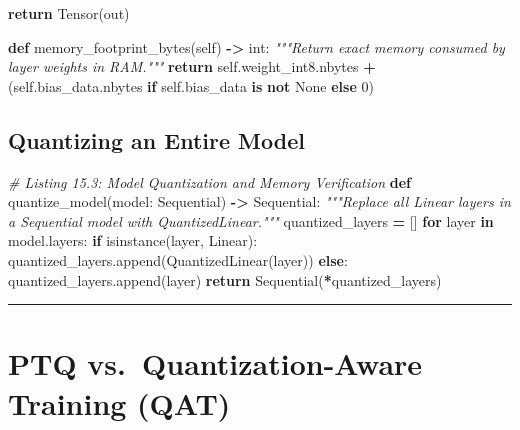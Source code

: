 \documentclass[
  letterpaper,
]{scrbook}
\newenvironment{Shaded}{\begin{snugshade}}{\end{snugshade}}
\newcommand{\BuiltInTok}[1]{#1}
\newcommand{\CommentTok}[1]{\textcolor[rgb]{0.56,0.35,0.01}{\textit{#1}}}
\newcommand{\ControlFlowTok}[1]{\textcolor[rgb]{0.13,0.29,0.53}{\textbf{#1}}}
\newcommand{\DecValTok}[1]{\textcolor[rgb]{0.00,0.00,0.81}{#1}}
\newcommand{\KeywordTok}[1]{\textcolor[rgb]{0.13,0.29,0.53}{\textbf{#1}}}
\newcommand{\NormalTok}[1]{#1}
\newcommand{\OperatorTok}[1]{\textcolor[rgb]{0.81,0.36,0.00}{\textbf{#1}}}
\newcommand{\VariableTok}[1]{\textcolor[rgb]{0.00,0.00,0.00}{#1}}
\begin{document}
\begin{Shaded}
\begin{Highlighting}[]
        \ControlFlowTok{return}\NormalTok{ Tensor(out)}

    \KeywordTok{def}\NormalTok{ memory\_footprint\_bytes(}\VariableTok{self}\NormalTok{) }\OperatorTok{{-}\textgreater{}} \BuiltInTok{int}\NormalTok{:}
        \CommentTok{"""Return exact memory consumed by layer weights in RAM."""}
        \ControlFlowTok{return} \VariableTok{self}\NormalTok{.weight\_int8.nbytes }\OperatorTok{+}\NormalTok{ (}\VariableTok{self}\NormalTok{.bias\_data.nbytes }\ControlFlowTok{if} \VariableTok{self}\NormalTok{.bias\_data }\KeywordTok{is} \KeywordTok{not} \VariableTok{None} \ControlFlowTok{else} \DecValTok{0}\NormalTok{)}
\end{Highlighting}
\end{Shaded}

\subsection{Quantizing an Entire
Model}\label{quantizing-an-entire-model}

\begin{Shaded}
\begin{Highlighting}[]
\CommentTok{\# Listing 15.3: Model Quantization and Memory Verification}
\KeywordTok{def}\NormalTok{ quantize\_model(model: Sequential) }\OperatorTok{{-}\textgreater{}}\NormalTok{ Sequential:}
    \CommentTok{"""Replace all Linear layers in a Sequential model with QuantizedLinear."""}
\NormalTok{    quantized\_layers }\OperatorTok{=}\NormalTok{ []}
    \ControlFlowTok{for}\NormalTok{ layer }\KeywordTok{in}\NormalTok{ model.layers:}
        \ControlFlowTok{if} \BuiltInTok{isinstance}\NormalTok{(layer, Linear):}
\NormalTok{            quantized\_layers.append(QuantizedLinear(layer))}
        \ControlFlowTok{else}\NormalTok{:}
\NormalTok{            quantized\_layers.append(layer)}
    \ControlFlowTok{return}\NormalTok{ Sequential(}\OperatorTok{*}\NormalTok{quantized\_layers)}
\end{Highlighting}
\end{Shaded}

\begin{center}\rule{0.5\linewidth}{0.5pt}\end{center}

\section{PTQ vs.~Quantization-Aware Training
(QAT)}\label{ptq-vs.-quantization-aware-training-qat}
\end{document}
